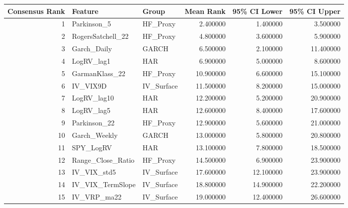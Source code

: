 \begin{tabular}{rllrrr}
\toprule
Consensus Rank & Feature & Group & Mean Rank & 95\% CI Lower & 95\% CI Upper \\
\midrule
1 & Parkinson\_5 & HF\_Proxy & 2.400000 & 1.400000 & 3.500000 \\
2 & RogersSatchell\_22 & HF\_Proxy & 4.800000 & 3.600000 & 5.900000 \\
3 & Garch\_Daily & GARCH & 6.500000 & 2.100000 & 11.400000 \\
4 & LogRV\_lag1 & HAR & 6.900000 & 5.000000 & 8.600000 \\
5 & GarmanKlass\_22 & HF\_Proxy & 10.900000 & 6.600000 & 15.100000 \\
6 & IV\_VIX9D & IV\_Surface & 11.500000 & 8.200000 & 15.000000 \\
7 & LogRV\_lag10 & HAR & 12.200000 & 5.200000 & 20.900000 \\
8 & LogRV\_lag5 & HAR & 12.600000 & 8.400000 & 17.600000 \\
9 & Parkinson\_22 & HF\_Proxy & 12.900000 & 5.600000 & 21.000000 \\
10 & Garch\_Weekly & GARCH & 13.000000 & 5.800000 & 20.800000 \\
11 & SPY\_LogRV & HAR & 13.100000 & 7.800000 & 18.500000 \\
12 & Range\_Close\_Ratio & HF\_Proxy & 14.500000 & 6.900000 & 23.900000 \\
13 & IV\_VIX\_std5 & IV\_Surface & 17.600000 & 12.100000 & 23.900000 \\
14 & IV\_VIX\_TermSlope & IV\_Surface & 18.800000 & 14.900000 & 22.200000 \\
15 & IV\_VRP\_ma22 & IV\_Surface & 19.000000 & 12.400000 & 26.600000 \\
\bottomrule
\end{tabular}
